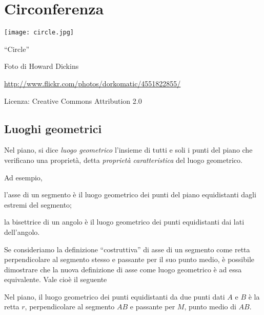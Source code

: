 \chapter{Circonferenza}\label{chap:circonferenza}

\texttt{[image: circle.jpg]}
  \begin{center}
    {\large ``Circle''}\par
    Foto di Howard Dickins\par
    \url{http://www.flickr.com/photos/dorkomatic/4551822855/}\par
    Licenza: Creative Commons Attribution 2.0\par
  \end{center}
\newpage

\section{Luoghi geometrici}

\begin{definizione}
Nel piano, si dice \emph{luogo geometrico} l'insieme di tutti e soli i punti del piano che verificano una proprietà, detta \emph{proprietà caratteristica} del luogo geometrico.
\end{definizione}
Ad esempio,
\begin{itemize*}
\item l'asse di un segmento è il luogo geometrico dei punti del piano equidistanti dagli estremi del segmento;
\item la bisettrice di un angolo è il luogo geometrico dei punti equidistanti dai lati dell'angolo.
\end{itemize*}
Se consideriamo la definizione ``costruttiva'' di asse di un segmento come retta perpendicolare al segmento stesso e passante per il suo punto medio, è possibile dimostrare che la nuova definizione di asse come luogo geometrico è ad essa equivalente.
Vale cioè il seguente
\begin{teorema}
Nel piano, il luogo geometrico dei punti equidistanti da due punti dati $A$ e $B$ è la retta $r$, perpendicolare al segmento $AB$ e passante per $M$, punto medio di $AB$.
\end{teorema}

